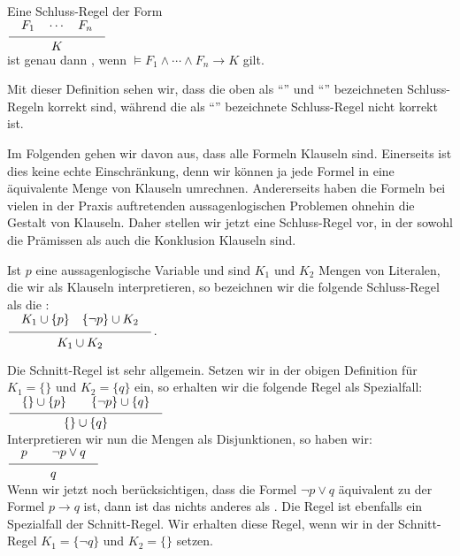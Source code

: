 \begin{Definition}
  Eine Schluss-Regel der Form \\[0.2cm]
  \hspace*{1.3cm} $\schluss{F_1 \quad \cdots \quad F_n}{K}$ \\[0.2cm]
  ist genau dann , wenn 
  $\models F_1 \wedge \cdots \wedge F_n \rightarrow K$ gilt. \eox
\end{Definition}
Mit dieser Definition sehen wir, dass 
die oben als ``'' und ``'' bezeichneten
Schluss-Regeln korrekt sind, während die als  ``'' bezeichnete
Schluss-Regel nicht korrekt ist.

Im Folgenden gehen wir davon aus, dass alle Formeln Klauseln sind.  Einerseits ist dies
keine echte Einschränkung, denn wir können ja jede Formel in eine äquivalente Menge von
Klauseln umrechnen.  Andererseits haben die Formeln bei vielen in der Praxis auftretenden aussagenlogischen
Problemen ohnehin die Gestalt von Klauseln.  Daher stellen wir jetzt eine Schluss-Regel vor, in der
sowohl die Prämissen als auch die Konklusion Klauseln sind.
     
\begin{Definition}
    Ist $p$ eine aussagenlogische Variable und sind $K_1$ und $K_2$ Mengen von Literalen,
    die wir als Klauseln interpretieren, so bezeichnen wir die folgende Schluss-Regel
    als die : 
    \\[0.2cm]
    \hspace*{1.3cm}
    $\ds \schluss{ K_1 \cup \{p\} \quad \{\neg p\} \cup K_2 }{K_1 \cup K_2}$. 
    \eox
\end{Definition}

\noindent
Die Schnitt-Regel ist sehr allgemein.  Setzen wir in der obigen Definition für $K_1 = \{\}$ und  $K_2 = \{q\}$ 
ein, so erhalten wir die folgende Regel als Spezialfall: \\[0.2cm]
\hspace*{1.3cm} $\schluss{\{\} \cup \{p\} \quad\quad \{\neg p\} \cup \{ q \} }{ \{\} \cup \{q\} }$ \\[0.2cm]
Interpretieren wir nun die Mengen als Disjunktionen, so haben wir: \\[0.2cm]
\hspace*{1.3cm}  $\schluss{p \quad\quad \neg p \vee q }{ q }$ \\[0.2cm]
Wenn wir jetzt noch berücksichtigen, dass die Formel $\neg p \vee q$ äquivalent zu der
Formel $p \rightarrow q$ ist, dann ist das nichts anderes als .  
Die Regel  ist ebenfalls ein Spezialfall der Schnitt-Regel.  Wir
erhalten diese Regel, wenn wir in der Schnitt-Regel $K_1 = \{ \neg q \}$ und $K_2 = \{\}$ setzen.


